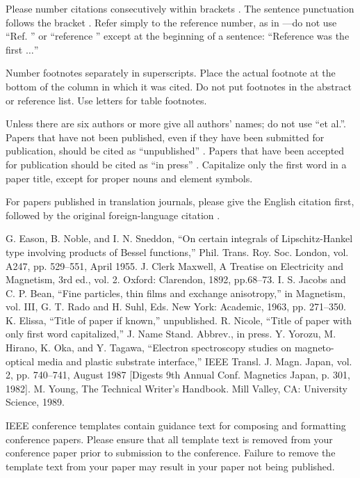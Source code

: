 \documentclass[conference]{IEEEtran}
\begin{document}
    Please number citations consecutively within brackets \cite{b1}. The 
    sentence punctuation follows the bracket \cite{b2}. Refer simply to the reference 
    number, as in \cite{b3}---do not use ``Ref. \cite{b3}'' or ``reference \cite{b3}'' except at 
    the beginning of a sentence: ``Reference \cite{b3} was the first $\ldots$''

    Number footnotes separately in superscripts. Place the actual footnote at 
    the bottom of the column in which it was cited. Do not put footnotes in the 
    abstract or reference list. Use letters for table footnotes.

    Unless there are six authors or more give all authors' names; do not use 
    ``et al.''. Papers that have not been published, even if they have been 
    submitted for publication, should be cited as ``unpublished'' \cite{b4}. Papers 
    that have been accepted for publication should be cited as ``in press'' \cite{b5}. 
    Capitalize only the first word in a paper title, except for proper nouns and 
    element symbols.

    For papers published in translation journals, please give the English 
    citation first, followed by the original foreign-language citation \cite{b6}.

\begin{thebibliography}{00}
 G. Eason, B. Noble, and I. N. Sneddon, ``On certain integrals of Lipschitz-Hankel type involving products of Bessel functions,'' Phil. Trans. Roy. Soc. London, vol. A247, pp. 529--551, April 1955.
 J. Clerk Maxwell, A Treatise on Electricity and Magnetism, 3rd ed., vol. 2. Oxford: Clarendon, 1892, pp.68--73.
 I. S. Jacobs and C. P. Bean, ``Fine particles, thin films and exchange anisotropy,'' in Magnetism, vol. III, G. T. Rado and H. Suhl, Eds. New York: Academic, 1963, pp. 271--350.
 K. Elissa, ``Title of paper if known,'' unpublished.
 R. Nicole, ``Title of paper with only first word capitalized,'' J. Name Stand. Abbrev., in press.
 Y. Yorozu, M. Hirano, K. Oka, and Y. Tagawa, ``Electron spectroscopy studies on magneto-optical media and plastic substrate interface,'' IEEE Transl. J. Magn. Japan, vol. 2, pp. 740--741, August 1987 [Digests 9th Annual Conf. Magnetics Japan, p. 301, 1982].
 M. Young, The Technical Writer's Handbook. Mill Valley, CA: University Science, 1989.
\end{thebibliography}
\vspace{12pt}
\color{red}
IEEE conference templates contain guidance text for composing and formatting conference papers. Please ensure that all template text is removed from your conference paper prior to submission to the conference. Failure to remove the template text from your paper may result in your paper not being published.
\end{document}
